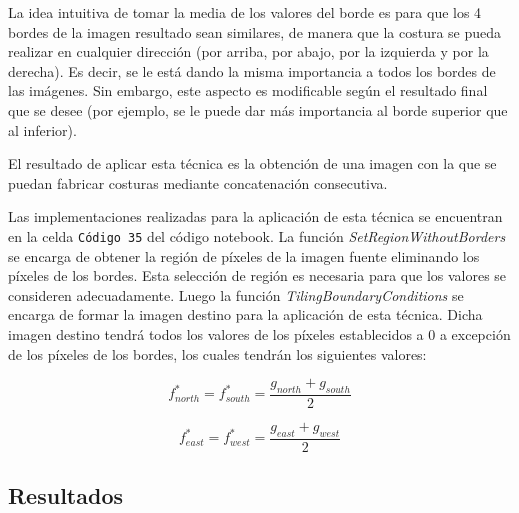 \documentclass[11pt,twoside,titlepage,a4paper]{article}
\numberwithin{equation}{section} %
\theoremstyle{usual}
\begin{document}
La idea intuitiva de tomar la media de los valores del borde es para que los 4 bordes de la imagen resultado sean similares, de manera que la costura se pueda realizar en cualquier dirección (por arriba, por abajo, por la izquierda y por la derecha). Es decir, se le está dando la misma importancia a todos los bordes de las imágenes. Sin embargo, este aspecto es modificable según el resultado final que se desee (por ejemplo, se le puede dar más importancia al borde superior que al inferior).

El resultado de aplicar esta técnica es la obtención de una imagen con la que se puedan fabricar costuras mediante concatenación consecutiva.

Las implementaciones realizadas para la aplicación de esta técnica se encuentran en la celda \texttt{Código 35} del código notebook. La función \textit{SetRegionWithoutBorders} se encarga de obtener la región de píxeles de la imagen fuente eliminando los píxeles de los bordes. Esta selección de región es necesaria para que los valores se consideren adecuadamente. Luego la función \textit{TilingBoundaryConditions} se encarga de formar la imagen destino para la aplicación de esta técnica. Dicha imagen destino tendrá todos los valores de los píxeles establecidos a 0 a excepción de los píxeles de los bordes, los cuales tendrán los siguientes valores:

\begin{equation}
 f^*_{north} = f^*_{south} = \frac{g_{north} + g_{south}}{2}
\end{equation}

\begin{equation}
f^*_{east} = f^*_{west} = \frac{g_{east} + g_{west}}{2}
\end{equation}

\subsection{Resultados}
\end{document}
